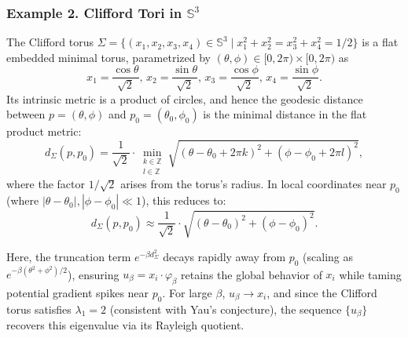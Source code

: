 \documentclass[a4, 12pt]{amsart}
\numberwithin{equation}{section} \numberwithin{equation}{section}
\begin{document}
\subsubsection{Example 2. Clifford Tori in $\mathbb{S}^3$}
The Clifford torus $\Sigma = \{(x_1, x_2, x_3, x_4) \in \mathbb{S}^3 \mid x_1^2 + x_2^2 = x_3^2 + x_4^2 = 1/2\}$ is a flat embedded minimal torus, parametrized by $(\theta, \phi) \in [0, 2\pi) \times [0, 2\pi)$ as
\begin{equation*}
x_1 = \frac{\cos\theta}{\sqrt{2}}, \, x_2 = \frac{\sin\theta}{\sqrt{2}}, \, x_3 = \frac{\cos\phi}{\sqrt{2}}, \, x_4 = \frac{\sin\phi}{\sqrt{2}}.
\end{equation*}
Its intrinsic metric is a product of circles, and hence the geodesic distance between $p = (\theta, \phi)$ and $p_0 = (\theta_0, \phi_0)$ is the minimal distance in the flat product metric:
\begin{equation*}
d_\Sigma(p, p_0) = \frac{1}{\sqrt{2}} \cdot \min_{\substack{k \in \mathbb{Z} \\ l \in \mathbb{Z}}} \sqrt{(\theta - \theta_0 + 2\pi k)^2 + (\phi - \phi_0 + 2\pi l)^2},
\end{equation*}
where the factor $1/\sqrt{2}$ arises from the torus's radius. In local coordinates near $p_0$ (where $|\theta - \theta_0|, |\phi - \phi_0| \ll 1$), this reduces to:
\begin{equation*}
d_\Sigma(p, p_0) \approx \frac{1}{\sqrt{2}} \cdot \sqrt{(\theta - \theta_0)^2 + (\phi - \phi_0)^2}.
\end{equation*}

Here, the truncation term $e^{-\beta d_\Sigma^2}$ decays rapidly away from $p_0$ (scaling as $e^{-\beta (\theta^2 + \phi^2)/2}$), ensuring $u_\beta = x_i \cdot \varphi_\beta$ retains the global behavior of $x_i$ while taming potential gradient spikes near $p_0$. For large $\beta$, $u_\beta \to x_i$, and since the Clifford torus satisfies $\lambda_1 = 2$ (consistent with Yau's conjecture), the sequence $\{u_\beta\}$ recovers this eigenvalue via its Rayleigh quotient.
\end{document}
